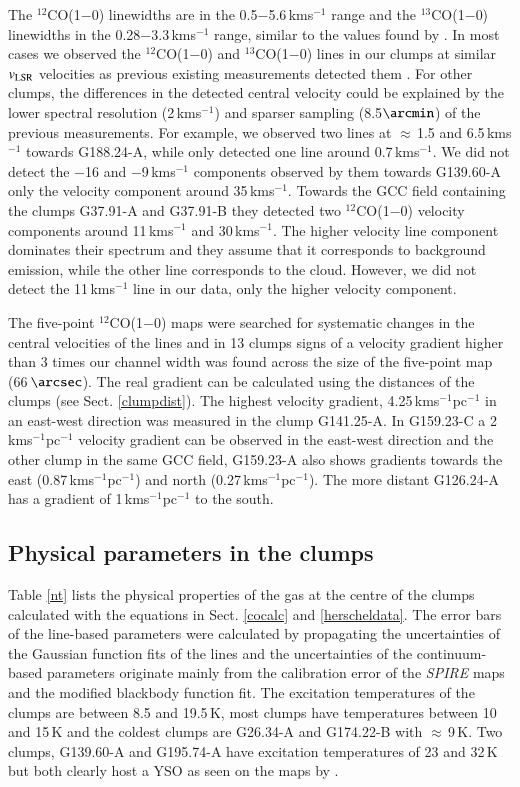 \documentclass[printer]{aa}
\begin{document}
The $^{12}$CO(1$-$0) linewidths are in the 0.5$-$5.6\,kms$^{-1}$ range and the $^{13}$CO(1$-$0) linewidths in the 0.28$-$3.3\,kms$^{-1}$ range, similar to the values found by \citet{wu2012}. In most cases we observed the $^{12}$CO(1$-$0) and $^{13}$CO(1$-$0) lines in our clumps at similar $v_{\rm LSR}$ velocities as previous existing measurements detected them \citep{dame2001, wu2012}. For other clumps, the differences in the detected central velocity could be explained by the lower spectral resolution (2\,kms$^{-1}$) and sparser sampling (8.5$\arcmin$) of the previous measurements. For example, we observed two lines at $\approx$\,1.5 and 6.5\,kms$^{-1}$ towards G188.24-A, while \citet{dame2001} only detected one line around 0.7\,kms$^{-1}$. We did not detect the $-$16 and $-$9\,kms$^{-1}$ components observed by them towards G139.60-A only the velocity component around 35\,kms$^{-1}$. Towards the GCC field containing the clumps G37.91-A and G37.91-B they detected two $^{12}$CO(1$-$0) velocity components around 11\,kms$^{-1}$ and 30\,kms$^{-1}$. The higher velocity line component dominates their spectrum and they assume that it corresponds to background emission, while the other line corresponds to the cloud. However, we did not detect the 11\,kms$^{-1}$ line in our data, only the higher velocity component.

The five-point $^{12}$CO(1$-$0) maps were searched for systematic changes in the central velocities of the lines and in 13 clumps signs of a velocity gradient higher than 3 times our channel width was found across the size of the five-point map (66\,$\arcsec$). The real gradient can be calculated using the distances of the clumps (see Sect. \ref{clumpdist}). The highest velocity gradient, 4.25\,kms$^{-1}$pc$^{-1}$ in an east-west direction was measured in the clump G141.25-A. In G159.23-C a 2\,kms$^{-1}$pc$^{-1}$ velocity gradient can be observed in the east-west direction and the other clump in the same GCC field, G159.23-A also shows gradients towards the east (0.87\,kms$^{-1}$pc$^{-1}$) and north (0.27\,kms$^{-1}$pc$^{-1}$). The more distant G126.24-A has a gradient of 1\,kms$^{-1}$pc$^{-1}$ to the south.

\subsection{Physical parameters in the clumps}
\label{res:physpar}

Table \ref{nt} lists the physical properties of the gas at the centre of the clumps calculated with the equations in Sect. \ref{cocalc} and \ref{herscheldata}. The error bars of the line-based parameters were calculated by propagating the uncertainties of the Gaussian function fits of the lines and the uncertainties of the continuum-based parameters originate mainly from the calibration error of the \textit{SPIRE} maps and the modified blackbody function fit. The excitation temperatures of the clumps are between 8.5 and 19.5\,K, most clumps have temperatures between 10 and 15\,K and the coldest clumps are G26.34-A and G174.22-B with $\approx$\,9\,K. Two clumps, G139.60-A and G195.74-A have excitation temperatures of 23 and 32\,K but both clearly host a YSO as seen on the maps by \citet{montillaud2015}.
\end{document}
